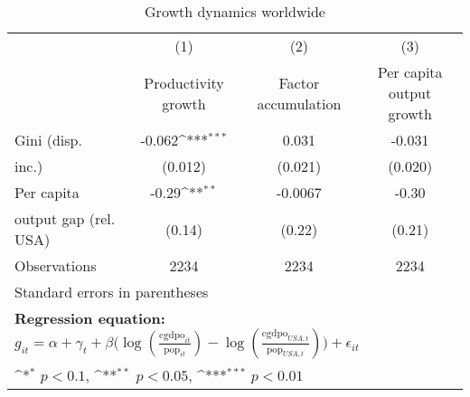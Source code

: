 \begin{table}[htbp]\centering
\def\sym#1{\ifmmode^{#1}\else\(^{#1}\)\fi}
\caption{Growth dynamics worldwide}
\begin{tabular}{l*{3}{c}}
\hline\hline
                &\multicolumn{1}{c}{(1)}&\multicolumn{1}{c}{(2)}&\multicolumn{1}{c}{(3)}\\
                &\multicolumn{1}{c}{Productivity growth}&\multicolumn{1}{c}{Factor accumulation}&\multicolumn{1}{c}{Per capita output growth}\\
\hline
Gini (disp.     &   -0.062\sym{***}&    0.031         &   -0.031         \\
inc.)           &  (0.012)         &  (0.021)         &  (0.020)         \\
[1em]
Per capita      &    -0.29\sym{**} &  -0.0067         &    -0.30         \\
output gap (rel. USA)&   (0.14)         &   (0.22)         &   (0.21)         \\
\hline
Observations    &     2234         &     2234         &     2234         \\
\hline\hline
\multicolumn{4}{l}{\footnotesize Standard errors in parentheses}\\
\multicolumn{4}{l}{\footnotesize \textbf{Regression equation:} \(g_{it} = \alpha + \gamma_t + \beta \big(\log (\frac{\textrm{cgdpo}_{it}}{\textrm{pop}_{it}} ) - \log (\frac{\textrm{cgdpo}_{USA,t}}{\textrm{pop}_{USA,t}}  ) \big) + \epsilon_{it}\)}\\
\multicolumn{4}{l}{\footnotesize \sym{*} \(p<0.1\), \sym{**} \(p<0.05\), \sym{***} \(p<0.01\)}\\
\end{tabular}
\end{table}

